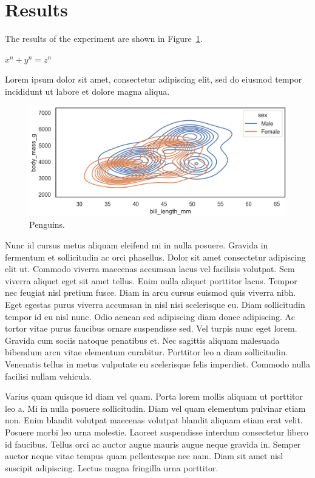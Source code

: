 

\section{Results}

The results of the experiment are shown in Figure~\ref{fig:penguins}.

$ x^n + y^n = z^n $

Lorem ipsum dolor sit amet, consectetur adipiscing elit, sed do eiusmod tempor incididunt ut labore et dolore magna aliqua.

\begin{figure}[]
    \centering
    \includegraphics[width=\linewidth]{figures/penguins_distribution.png}
    \caption{Penguins.}
    \label{fig:penguins}
\end{figure}

Nunc id cursus metus aliquam eleifend mi in nulla posuere. Gravida in fermentum et sollicitudin ac orci phasellus. Dolor sit amet consectetur adipiscing elit ut. Commodo viverra maecenas accumsan lacus vel facilisis volutpat. Sem viverra aliquet eget sit amet tellus. Enim nulla aliquet porttitor lacus. Tempor nec feugiat nisl pretium fusce. Diam in arcu cursus euismod quis viverra nibh. Eget egestas purus viverra accumsan in nisl nisi scelerisque eu. Diam sollicitudin tempor id eu nisl nunc. Odio aenean sed adipiscing diam donec adipiscing. Ac tortor vitae purus faucibus ornare suspendisse sed. Vel turpis nunc eget lorem. Gravida cum sociis natoque penatibus et. Nec sagittis aliquam malesuada bibendum arcu vitae elementum curabitur. Porttitor leo a diam sollicitudin. Venenatis tellus in metus vulputate eu scelerisque felis imperdiet. Commodo nulla facilisi nullam vehicula.



Varius quam quisque id diam vel quam. Porta lorem mollis aliquam ut porttitor leo a. Mi in nulla posuere sollicitudin. Diam vel quam elementum pulvinar etiam non. Enim blandit volutpat maecenas volutpat blandit aliquam etiam erat velit. Posuere morbi leo urna molestie. Laoreet suspendisse interdum consectetur libero id faucibus. Tellus orci ac auctor augue mauris augue neque gravida in. Semper auctor neque vitae tempus quam pellentesque nec nam. Diam sit amet nisl suscipit adipiscing. Lectus magna fringilla urna porttitor.

